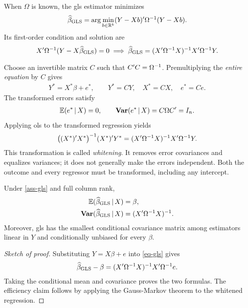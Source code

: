 \documentclass[a4paper,12pt]{article}
\begin{document}
\begin{definition}
    When $\Omega$ is known, the \gls{gls} estimator minimizes
    \begin{align}\label{eq-gls-objective}
        \widehat\beta_{\mathrm{GLS}}
        =\arg\min_{b\in\mathbb{R}^k}(Y-Xb)^{\prime}\Omega^{-1}(Y-Xb).
    \end{align}
    Its first-order condition and solution are
    \begin{align}
        X^{\prime}\Omega^{-1}(Y-X\widehat\beta_{\mathrm{GLS}})=0
		\implies
        \widehat\beta_{\mathrm{GLS}}
        =(X^{\prime}\Omega^{-1} X)^{-1} X^{\prime}\Omega^{-1} Y.\label{eq-gls}
    \end{align}
\end{definition}

\begin{remark}
	Choose an invertible matrix $C$ such that $C^{\prime} C=\Omega^{-1}$.
	Premultiplying the \emph{entire equation} by $C$ gives
	\begin{align}
		Y^*=X^*\beta+e^*,
		\qquad Y^*=CY,\quad X^*=CX,\quad e^*=Ce.
	\end{align}
	The transformed errors satisfy
	\begin{align}
		\operatorname{\mathbb{E}}(e^*\mathpunct{}|\mathpunct{} X)=0,\qquad
		\operatorname{\text{\textrm{\upshape\textbf{Var}}}}(e^*\mathpunct{}|\mathpunct{} X)= C\Omega C^{\prime}= I_n.
	\end{align}
	Applying \gls{ols} to the transformed regression yields
	\begin{align}
		\bigl((X^*)^{\prime} X^*\bigr)^{-1} (X^*)^{\prime} Y^*
		=(X^{\prime}\Omega^{-1} X)^{-1} X^{\prime}\Omega^{-1} Y.
	\end{align}
	This transformation is called \emph{whitening}.
	It removes error covariances and equalizes variances;
	it does not generally make the errors independent.
	Both the outcome and every regressor must be transformed, including any intercept.
\end{remark}

\begin{theorem}\label{thm-gls}
    Under \autoref{ass-gls} and full column rank,
    \begin{align}
        \operatorname{\mathbb{E}}(\widehat\beta_{\mathrm{GLS}}\mathpunct{}|\mathpunct{} X)&=\beta,\\
        \operatorname{\text{\textrm{\upshape\textbf{Var}}}}(\widehat\beta_{\mathrm{GLS}}\mathpunct{}|\mathpunct{} X)
        &=(X^{\prime}\Omega^{-1} X)^{-1}.
    \end{align}
    Moreover, \gls{gls} has the smallest conditional covariance matrix
    among estimators linear in $Y$ and conditionally unbiased for every $\beta$.
\end{theorem}
\begin{proof}[Sketch of proof]
    Substituting $Y=X\beta+e$ into \eqref{eq-gls} gives
    \begin{align*}
        \widehat\beta_{\mathrm{GLS}}-\beta
        =(X^{\prime}\Omega^{-1} X)^{-1} X^{\prime}\Omega^{-1} e.
    \end{align*}
    Taking the conditional mean and covariance proves the two formulas.
    The efficiency claim follows by applying the Gauss-Markov theorem to the whitened regression.
\end{proof}
\end{document}
